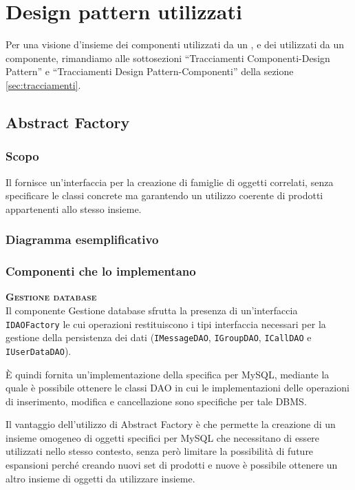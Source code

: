 \section{Design pattern utilizzati}

Per una visione d'insieme dei componenti utilizzati da un , e dei  utilizzati da un componente, rimandiamo alle sottosezioni ``Tracciamenti Componenti-Design Pattern'' e ``Tracciamenti Design Pattern-Componenti'' della sezione \vref{sec:tracciamenti}.

\subsection{Abstract Factory}
\subsubsection{Scopo}
Il  fornisce un'interfaccia per la creazione di famiglie di oggetti correlati, senza specificare le classi concrete ma garantendo un utilizzo coerente di prodotti appartenenti allo stesso insieme.

\subsubsection{Diagramma esemplificativo}
\subsubsection{Componenti che lo implementano}
\begin{description}
  \item{\bfseries\scshape Gestione database}\\
Il componente Gestione database sfrutta la presenza di un'interfaccia \texttt{IDAOFactory} le cui operazioni restituiscono i tipi interfaccia necessari per la gestione della persistenza dei dati (\texttt{IMessageDAO}, \texttt{IGroupDAO}, \texttt{ICallDAO} e \texttt{IUserDataDAO}).

È quindi fornita un'implementazione della  specifica per MySQL, mediante la quale è possibile ottenere le classi DAO in cui le implementazioni delle operazioni di inserimento, modifica e cancellazione sono specifiche per tale DBMS\@.

Il vantaggio dell'utilizzo di Abstract Factory è che permette la creazione di un insieme omogeneo di oggetti specifici per MySQL che necessitano di essere utilizzati nello stesso contesto, senza però limitare la possibilità di future espansioni perché creando nuovi set di prodotti e nuove  è possibile ottenere un altro insieme di oggetti da utilizzare insieme.
\end{description}

